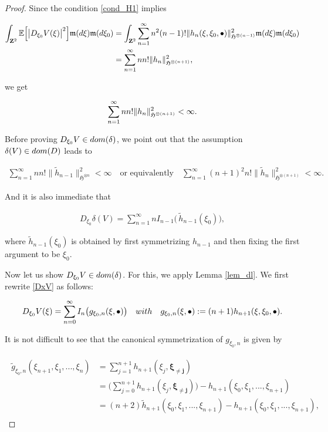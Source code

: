 \documentclass[10pt,a4paper]{amsart}
\newcommand{\E}{\mathbb{E}}
\newcommand{\bul}{\bullet}
\newcommand{\dl}{\delta}
\newcommand{\dom}{\textup{dom}}
\newcommand{\fH}{\mathfrak{H}}
\newcommand{\fm}{\mathfrak{m}}
\newcommand{\noi}{\noindent}
\newcommand{\wt}{\widetilde}
\begin{document}
\begin{proof}
\noi
Since 
the condition \eqref{cond_H1}    implies

\noi
\begin{align}
\int_{\mathbf{Z}^2} \E \Big[ \big| D_{\xi_0} V(\xi) \big|^2 \Big]  \fm(d\xi) \fm(d\xi_0) 
&=  \int_{\mathbf{Z}^2}  \sum_{n=1}^\infty n^2 (n-1)! \| h_n(\xi, \xi_0, \bul) \|^2_{\fH^{\otimes (n-1)}}  
\fm(d\xi) \fm(d\xi_0) \notag   \\
&= \sum_{n=1}^\infty n  n! \| h_n \|^2_{\fH^{\otimes (n+1)}},
\label{cond_H2}
\end{align}  

\noi
we get 

\noi
\begin{align}
\sum_{n=1}^\infty n  n! \| h_n \|^2_{\fH^{\otimes (n+1)}} < \infty.
 \notag%
\end{align}  

Before proving  $D_{\xi_0} V\in\dom(\dl)$,
we point out that the assumption $\dl(V)\in\dom(D)$ leads to 

\noi
\begin{align}
\sum_{n=1}^\infty n n! \| \wt{h}_{n-1}\|^2_{\fH^{\otimes n}} <\infty
\quad\text{or equivalently}
\quad
\sum_{n=1}^\infty (n+1)^2 n! \| \wt{h}_{n}\|^2_{\fH^{\otimes (n+1)}} <\infty.
\label{cond_H3}
\end{align}

\noi
And it is also immediate that 

\noi
\begin{align}
D_{\xi_0} \dl(V) = \sum_{n=1}^\infty n I_{n-1}\big(  \, \wt{h}_{n-1}(\xi_0) \big), 
\label{Dxdl}
\end{align}

\noi
where $ \wt{h}_{n-1}(\xi_0) $ is obtained by first symmetrizing $h_{n-1}$
and then fixing the first argument to be $\xi_0$.

Now let us show $D_{\xi_0} V\in\dom(\dl)$.
For this, we apply Lemma \ref{lem_dl}.
We first rewrite \eqref{DxV} as follows:


\noi
\begin{align*}
 D_{\xi_0} V(\xi)  =  \sum_{n=0}^\infty I_n\big( g_{\xi_0, n}(\xi, \bul) \big)
 \quad
 {\rm with}
 \quad
 g_{\xi_0, n}(\xi, \bul) := (n+1) h_{n+1}(\xi, \xi_0, \bul).
\end{align*}
 
\noi
It is not difficult to see that the canonical symmetrization of $ g_{\xi_0, n}$ is given by 

\noi
\begin{align}\label{syms}
\begin{aligned}
\wt  g_{\xi_0, n}(\xi_{n+1},  \xi_1, ... , \xi_n) 
&= \sum_{j=1}^{n+1} h_{n+1}(\xi_j,  \pmb{\xi_{\neq j}}) \\
&= \bigg(  \sum_{j=0}^{n+1} h_{n+1}(\xi_j,  \pmb{\xi_{\neq j}})  \bigg) - h_{n+1}(\xi_0, \xi_1, ... , \xi_{n+1}) \\
&= (n+2) \wt{h}_{n+1}(\xi_0, \xi_1, ... , \xi_{n+1}) - h_{n+1}(\xi_0, \xi_1, ... , \xi_{n+1}),
\end{aligned} 
\end{align} 
 

\end{proof}
\end{document}

